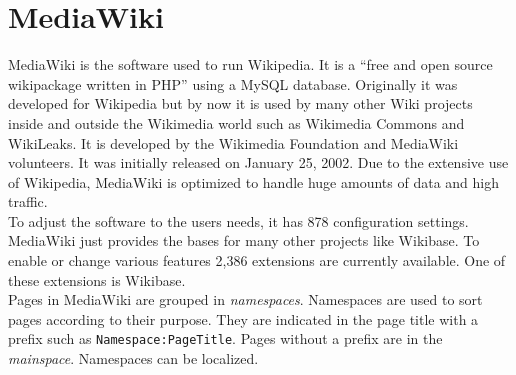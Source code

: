 \section{MediaWiki}

MediaWiki is the software used to run Wikipedia. It is a ``free and open source wikipackage written in PHP'' \citep{wiki:13} using a MySQL database. Originally it was developed for Wikipedia but by now it is used by many other Wiki projects inside and outside the Wikimedia world such as Wikimedia Commons and WikiLeaks. It is developed by the Wikimedia Foundation and MediaWiki volunteers. It was initially released on January 25, 2002. \citep{wiki:13} Due to the extensive use of Wikipedia, MediaWiki is optimized to handle huge amounts of data and high traffic. \citep{wiki:14} \\
To adjust the software to the users needs, it has 878 configuration settings. \citep{wiki:15} \\
MediaWiki just provides the bases for many other projects like Wikibase. To enable or change various features 2,386 extensions are currently available. \citep{wiki:16} One of these extensions is Wikibase. \\
Pages in MediaWiki are grouped in \textit{namespaces}. Namespaces are used to sort pages according to their purpose. They are indicated in the page title with a prefix such as \texttt{\justify Namespace:PageTitle}. Pages without a prefix are in the \textit{mainspace}. Namespaces can be localized. \citep{wiki:17}